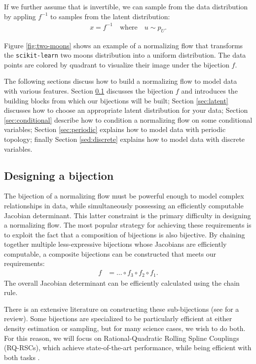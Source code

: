 \documentclass[twocolumn]{aastex631}
\newcommand{\pu}{p^{}_{U}}
\begin{document}
If we further assume that is invertible, we can sample from the data distribution by appling $f^{-1}$ to samples from the latent distribution:
\begin{align}
    x = f^{-1} \quad \text{where} \quad u \sim \pu.
\end{align}

Figure \ref{fig:two-moons} shows an example of a normalizing flow that transforms the \texttt{scikit-learn} two moons distribution into a uniform distribution.
The data points are colored by quadrant to visualize their image under the bijection $f$.

The following sections discuss how to build a normalizing flow to model data with various features.
Section \ref{sec:bijections} discusses the bijection $f$ and introduces the building blocks from which our bijections will be built;
Section \ref{sec:latent} discusses how to choose an appropriate latent distribution for your data;
Section \ref{sec:conditional} describe how to condition a normalizing flow on some conditional variables;
Section \ref{sec:periodic} explains how to model data with periodic topology;
finally Section \ref{sed:discrete} explains how to model data with discrete variables.


\subsection{Designing a bijection}
\label{sec:bijections}

The bijection of a normalizing flow must be powerful enough to model complex relationships in data, while simultaneously possessing an efficiently computable Jacobian determinant.
This latter constraint is the primary difficulty in designing a normalizing flow.
The most popular strategy for achieving these requirements is to exploit the fact that a composition of bijections is also bijective.
By chaining together multiple less-expressive bijections whose Jacobians are efficiently computable, a composite bijections can be constructed that meets our requirements:
\begin{align}
    f &= \dots \circ f_3 \circ f_2 \circ f_1.
\end{align}
The overall Jacobian determinant can be efficiently calculated using the chain rule.

There is an extensive literature on constructing these sub-bijections (see \citealt{kobyzev2020} for a review).
Some bijections are specialized to be particularly efficient at either density estimation or sampling, but for many science cases, we wish to do both.
For this reason, we will focus on Rational-Quadratic Rolling Spline Couplings (RQ-RSCs), which achieve state-of-the-art performance, while being efficient with both tasks \citep{durkan2019}.
\end{document}
